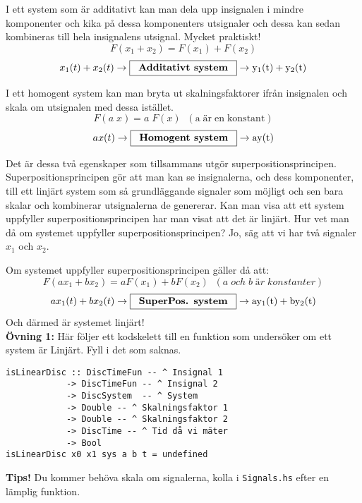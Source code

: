 \documentclass{article}
\begin{document}
I ett system som är additativt kan man dela upp insignalen i mindre
komponenter och kika på dessa komponenters utsignaler och dessa kan sedan
kombineras till hela insignalens utsignal. Mycket praktiskt!
$$F(x_{1}+x_{2}) = F(x_{1}) + F(x_{2})$$
$$x_{1}(t) + x_{2}(t) \rightarrow \framebox[1.2\width]{\textbf{Additativt system}} \rightarrow \mathrm{y_{1}(t) + y_{2}(t)}$$

I ett homogent system kan man bryta ut skalningsfaktorer ifrån insignalen och skala om utsignalen med dessa istället.
$$F(a \; x) = a\;F(x)\;\;\mathrm{(a\; är\; en\; konstant)} $$
$$a x(t) \rightarrow \framebox[1.2\width]{\textbf{Homogent system}} \rightarrow \mathrm{a y(t)}$$

Det är dessa två egenskaper som tillsammans utgör superpositionsprincipen.
Superpositionsprincipen gör att man kan se insignalerna, och dess
komponenter, till ett linjärt system som så grundläggande signaler som
möjligt och sen bara skalar och kombinerar utsignalerna de genererar.
Kan man visa att
ett system uppfyller superpositionsprincipen har man visat att det är
linjärt.
Hur vet man då om systemet uppfyller superpositionsprincipen? Jo, säg att vi har två signaler $x_1$ och $x_2$.

Om systemet uppfyller superpositionsprincipen gäller då att:
$$F(a x_{1}+b x_{2}) = a F(x_{1}) + b F(x_{2})
\;\;(a\; och\; b\; är\; konstanter) $$
$$a x_{1}(t)+b x_{2}(t) \rightarrow \framebox[1.2\width]{\textbf{SuperPos. system}} \rightarrow \mathrm{a y_{1}(t)+b y_{2}(t)}
$$
Och därmed är systemet linjärt!\\

\textbf{Övning 1:} Här följer ett kodskelett till en funktion som undersöker om ett
system är Linjärt. Fyll i det som saknas.
\begin{verbatim}
isLinearDisc :: DiscTimeFun -- ^ Insignal 1
            -> DiscTimeFun -- ^ Insignal 2
            -> DiscSystem  -- ^ System
            -> Double -- ^ Skalningsfaktor 1
            -> Double -- ^ Skalningsfaktor 2
            -> DiscTime -- ^ Tid då vi mäter
            -> Bool
isLinearDisc x0 x1 sys a b t = undefined
\end{verbatim}

\textbf{Tips!} Du kommer behöva skala om signalerna, kolla i {\tt Signals.hs} efter en
lämplig funktion.
\end{document}
